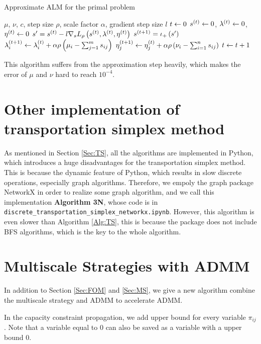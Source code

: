 \documentclass[english]{pkupaper}
\begin{document}
\begin{algorithm}
\caption{Approximate ALM for the primal problem}
\label{Alg:ApproxALM}
\begin{algorithmic}
\REQUIRE $\mu$, $\nu$, $c$, step size $\rho$, scale factor $\alpha$, gradient step size $l$
\STATE $ t \leftarrow 0 $
\STATE $ s^{\left( t \right)} \leftarrow 0 $, $ \lambda^{\left( t \right)} \leftarrow 0 $, $ \eta^{\left( t \right)} \leftarrow 0 $
\STATE $ s' = s^{\left( t \right)} - l \nabla_s L_{\rho} \left(  s^{\left( t \right)}, \lambda^{\left( t \right)}, \eta^{\left( t \right)}  \right) $
\STATE $ s^{\left(  t + 1  \right)} = \iota_+ \left( s' \right) $
\STATE $ \lambda^{\left(  t + 1  \right)}_i \leftarrow \lambda^{\left( t \right)}_i + \alpha \rho \left(  \mu_i - \sum_{ {j} = {1} }^{m}{s_{ i j }}  \right) $
\STATE $ \eta^{\left(  t + 1  \right)}_j \leftarrow \eta^{\left( t \right)}_j + \alpha \rho \left(  \nu_i - \sum_{ {i} = {1} }^{n}{s_{ i j }}  \right) $
\STATE $ t \leftarrow t + 1 $
\ENDWHILE
\end{algorithmic}
\end{algorithm}

This algorithm suffers from the approximation step heavily, which makes the error of $\mu$ and $\nu$ hard to reach $10^{-4}$.

\section{Other implementation of transportation simplex method}

As mentioned in Section \ref{Sec:TS}, all the algorithms are implemented in Python, which introduces a huge disadvantages for the transportation simplex method. This is because the dynamic feature of Python, which results in slow discrete operations, especially graph algorithms. Therefore, we empoly the graph package NetworkX in order to realize some graph algorithm, and we call this implementation \textbf{Algorithm \hypertarget{EAlg:3N}{3N}}, whose code is in \verb"discrete_transportation_simplex_networkx.ipynb". However, this algorithm is even slower than Algorithm \ref{Alg:TS}, this is because the package does not include BFS algorithms, which is the key to the whole algorithm.

\section{Multiscale Strategies with ADMM}

In addition to Section \ref{Sec:FOM} and \ref{Sec:MS}, we give a new algorithm combine the multiscale strategy and ADMM to accelerate ADMM.

In the capacity constraint propagation, we add upper bound for every variable $\pi_{ij}$. Note that a variable equal to $0$ can also be saved as a variable with a upper bound $0$.
\end{document}
